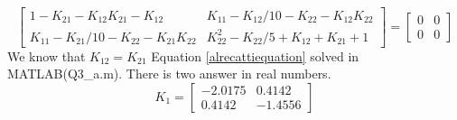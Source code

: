 $$
 \begin{bmatrix}\label{alrecattiequation}
	1 - K_{21} - K_{12}K_{21} - K_{12} &  K_{11} - K_{12}/10 - K_{22} - K_{12}K_{22} \\
	K_{11} - K_{21}/10 - K_{22} - K_{21}K_{22} & K_{22}^2 - K_{22}/5 + K_{12} + K_{21} + 1
\end{bmatrix} 
= \begin{bmatrix}
	0 & 0\\0 &0
\end{bmatrix}
$$
We know that $K_{12} = K_{21}$
Equation \ref{alrecattiequation} solved in MATLAB(Q3\_a.m).
There is two answer in real numbers.
$$K_1 = \begin{bmatrix} 
	-2.0175&  0.4142\\
	0.4142& -1.4556
\end{bmatrix}$$